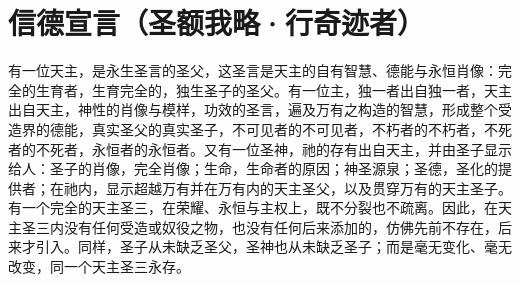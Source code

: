 
\chapter{信德宣言（圣额我略·行奇迹者）}


有一位天主，是永生圣言的圣父，这圣言是天主的自有智慧、德能与永恒肖像：完全的生育者，生育完全的，独生圣子的圣父。有一位主，独一者出自独一者，天主出自天主，神性的肖像与模样，功效的圣言，遍及万有之构造的智慧，形成整个受造界的德能，真实圣父的真实圣子，不可见者的不可见者，不朽者的不朽者，不死者的不死者，永恒者的永恒者。又有一位圣神，祂的存有出自天主，并由圣子显示给人：圣子的肖像，完全肖像；生命，生命者的原因；神圣源泉；圣德，圣化的提供者；在祂内，显示超越万有并在万有内的天主圣父，以及贯穿万有的天主圣子。有一个完全的天主圣三，在荣耀、永恒与主权上，既不分裂也不疏离。因此，在天主圣三内没有任何受造或奴役之物，也没有任何后来添加的，仿佛先前不存在，后来才引入。同样，圣子从未缺乏圣父，圣神也从未缺乏圣子；而是毫无变化、毫无改变，同一个天主圣三永存。\par

